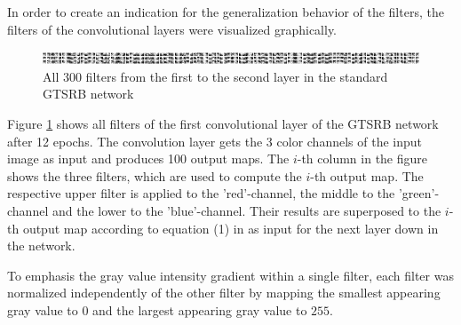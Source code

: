 \documentclass[11pt, a4paper]{article}
\begin{document}
\begin{appendix}
	In order to create an indication for the generalization behavior of the filters, the filters of the convolutional layers were visualized graphically.
	\begin{figure}[h!]
		\centering
		\includegraphics[width=1\textwidth]{filter_visualizations/weights_on_layer_0_horizontally_epoch_12_morph}
		\caption{All 300 filters from the first to the second layer in the standard GTSRB network}
		\label{fig:all_gtsrb_filter}
	\end{figure}
	 Figure \ref{fig:all_gtsrb_filter} shows all filters of the first convolutional layer of the GTSRB network after 12 epochs. The convolution layer gets the 3 color channels of the input image as input and produces 100 output maps. The $i$-th column in the figure shows the three filters, which are used to compute the $i$-th output map. The respective upper filter is applied to the 'red'-channel, the middle to the 'green'-channel and the lower to the 'blue'-channel. Their results are superposed to the $i$-th output map according to equation (1) in \cite{multi-column-neural-network-gtsrb} as input for the next layer down in the network.
	 
	 To emphasis the gray value intensity gradient within a single filter, each filter was normalized independently of the other filter by mapping the smallest appearing gray value to $0$ and the largest appearing gray value to $255$.

\end{appendix}

{}

\end{document}
